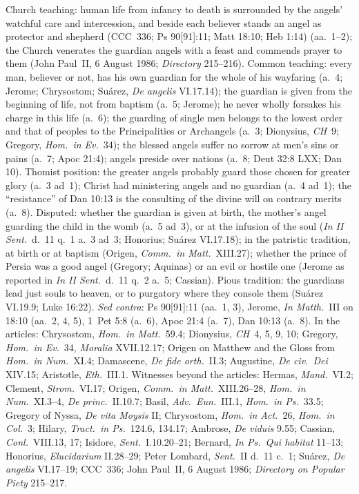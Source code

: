 {Church teaching: human life from infancy to death is surrounded by the
 angels' watchful care and intercession, and beside each believer stands an
 angel as protector and shepherd (CCC~336; Ps 90[91]:11; Matt 18:10; Heb
 1:14) (aa.~1--2); the Church venerates the guardian angels with a feast and
 commends prayer to them (John Paul~II, 6 August 1986; \emph{Directory}
 215--216). Common teaching: every man, believer or not, has his own
 guardian for the whole of his wayfaring (a.~4; Jerome; Chrysostom;
 Suárez, \emph{De angelis} VI.17.14); the guardian is given from the
 beginning of life, not from baptism (a.~5; Jerome); he never wholly
 forsakes his charge in this life (a.~6); the guarding of single men belongs
 to the lowest order and that of peoples to the Principalities or
 Archangels (a.~3; Dionysius, \emph{CH}~9; Gregory, \emph{Hom.\ in Ev.}\ 34);
 the blessed angels suffer no sorrow at men's sins or pains (a.~7; Apoc
 21:4); angels preside over nations (a.~8; Deut 32:8 LXX; Dan 10). Thomist
 position: the greater angels probably guard those chosen for greater glory
 (a.~3 ad~1); Christ had ministering angels and no guardian (a.~4 ad~1); the
 ``resistance'' of Dan 10:13 is the consulting of the divine will on contrary
 merits (a.~8). Disputed: whether the guardian is given at birth, the mother's
 angel guarding the child in the womb (a.~5 ad~3), or at the infusion of the
 soul (\emph{In II Sent.}\ d.~11 q.~1 a.~3 ad~3; Honorius; Suárez VI.17.18);
 in the patristic tradition, at birth or at baptism (Origen, \emph{Comm.\ in
 Matt.}\ XIII.27); whether the prince of Persia was a good angel (Gregory;
 Aquinas) or an evil or hostile one (Jerome as reported in \emph{In II
 Sent.}\ d.~11 q.~2 a.~5; Cassian). Pious tradition: the guardians lead just
 souls to heaven, or to purgatory where they console them (Suárez VI.19.9;
 Luke 16:22).}
 {\emph{Sed contra}: Ps 90[91]:11 (aa.~1, 3), Jerome, \emph{In Matth.}\ III on
 18:10 (aa.~2, 4, 5), 1~Pet 5:8 (a.~6), Apoc 21:4 (a.~7), Dan 10:13 (a.~8).
 In the articles: Chrysostom, \emph{Hom.\ in Matt.}\ 59.4; Dionysius,
 \emph{CH}~4, 5, 9, 10; Gregory, \emph{Hom.\ in Ev.}\ 34, \emph{Moralia}
 XVII.12.17; Origen on Matthew and the Gloss from \emph{Hom.\ in Num.}\ XI.4;
 Damascene, \emph{De fide orth.}\ II.3; Augustine, \emph{De civ.\ Dei}
 XIV.15; Aristotle, \emph{Eth.}\ III.1. Witnesses beyond the articles: Hermas,
 \emph{Mand.}\ VI.2; Clement, \emph{Strom.}\ VI.17; Origen, \emph{Comm.\ in
 Matt.}\ XIII.26--28, \emph{Hom.\ in Num.}\ XI.3--4, \emph{De princ.}\ II.10.7;
 Basil, \emph{Adv.\ Eun.}\ III.1, \emph{Hom.\ in Ps.}\ 33.5; Gregory of Nyssa,
 \emph{De vita Moysis} II; Chrysostom, \emph{Hom.\ in Act.}\ 26, \emph{Hom.\
 in Col.}\ 3; Hilary, \emph{Tract.\ in Ps.}\ 124.6, 134.17; Ambrose, \emph{De
 viduis} 9.55; Cassian, \emph{Conl.}\ VIII.13, 17; Isidore, \emph{Sent.}\
 I.10.20--21; Bernard, \emph{In Ps.\ Qui habitat} 11--13; Honorius,
 \emph{Elucidarium} II.28--29; Peter Lombard, \emph{Sent.}\ II d.~11 c.~1;
 Suárez, \emph{De angelis} VI.17--19; CCC~336; John Paul~II, 6 August 1986;
 \emph{Directory on Popular Piety} 215--217.}
